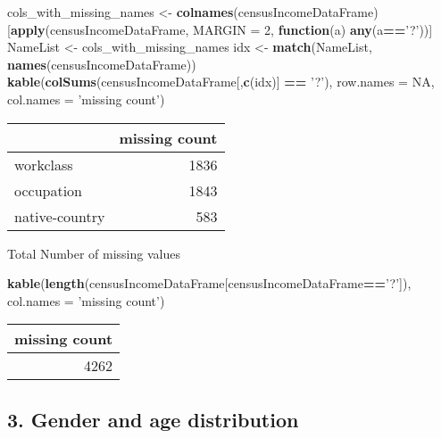 \documentclass[]{article}
\newenvironment{Shaded}{\begin{snugshade}}{\end{snugshade}}
\newcommand{\ControlFlowTok}[1]{\textcolor[rgb]{0.13,0.29,0.53}{\textbf{#1}}}
\newcommand{\DataTypeTok}[1]{\textcolor[rgb]{0.13,0.29,0.53}{#1}}
\newcommand{\DecValTok}[1]{\textcolor[rgb]{0.00,0.00,0.81}{#1}}
\newcommand{\KeywordTok}[1]{\textcolor[rgb]{0.13,0.29,0.53}{\textbf{#1}}}
\newcommand{\NormalTok}[1]{#1}
\newcommand{\OperatorTok}[1]{\textcolor[rgb]{0.81,0.36,0.00}{\textbf{#1}}}
\newcommand{\OtherTok}[1]{\textcolor[rgb]{0.56,0.35,0.01}{#1}}
\newcommand{\StringTok}[1]{\textcolor[rgb]{0.31,0.60,0.02}{#1}}
\begin{document}
\begin{Shaded}
\begin{Highlighting}[]
\NormalTok{cols_with_missing_names <-}\StringTok{ }\KeywordTok{colnames}\NormalTok{(censusIncomeDataFrame)[}\KeywordTok{apply}\NormalTok{(censusIncomeDataFrame, }\DataTypeTok{MARGIN =} \DecValTok{2}\NormalTok{, }\ControlFlowTok{function}\NormalTok{(a) }\KeywordTok{any}\NormalTok{(a}\OperatorTok{==}\StringTok{'?'}\NormalTok{))]}
\NormalTok{NameList <-}\StringTok{ }\NormalTok{cols_with_missing_names}
\NormalTok{idx <-}\StringTok{ }\KeywordTok{match}\NormalTok{(NameList, }\KeywordTok{names}\NormalTok{(censusIncomeDataFrame))}
\KeywordTok{kable}\NormalTok{(}\KeywordTok{colSums}\NormalTok{(censusIncomeDataFrame[,}\KeywordTok{c}\NormalTok{(idx)]  }\OperatorTok{==}\StringTok{ '?'}\NormalTok{), }\DataTypeTok{row.names =} \OtherTok{NA}\NormalTok{, }\DataTypeTok{col.names =} \StringTok{'missing count'}\NormalTok{)}
\end{Highlighting}
\end{Shaded}

\begin{tabular}{l|r}
\hline
  & missing count\\
\hline
workclass & 1836\\
\hline
occupation & 1843\\
\hline
native-country & 583\\
\hline
\end{tabular}

Total Number of missing values

\begin{Shaded}
\begin{Highlighting}[]
\KeywordTok{kable}\NormalTok{(}\KeywordTok{length}\NormalTok{(censusIncomeDataFrame[censusIncomeDataFrame}\OperatorTok{==}\StringTok{'?'}\NormalTok{]), }\DataTypeTok{col.names =} \StringTok{'missing count'}\NormalTok{)}
\end{Highlighting}
\end{Shaded}

\begin{tabular}{r}
\hline
missing count\\
\hline
4262\\
\hline
\end{tabular}

\hypertarget{gender-and-age-distribution}{%
\subsection{3. Gender and age
distribution}\label{gender-and-age-distribution}}
\end{document}
